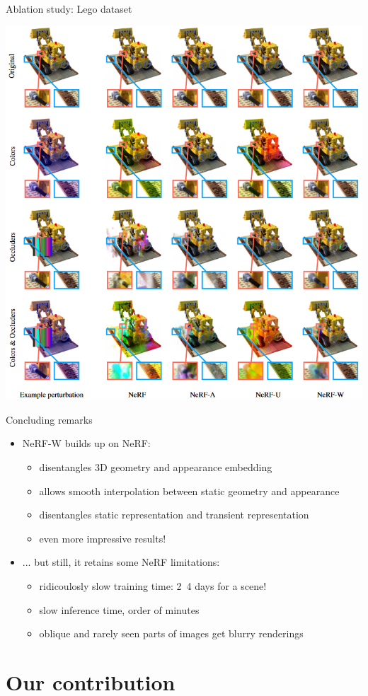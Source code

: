 \documentclass[aspectratio=1610]{beamer}
\begin{document}
\begin{frame}{Ablation study: Lego dataset}
    \begin{center}
        \includegraphics[width=.51\textwidth]{results-lego.png}
    \end{center}
\end{frame}

\begin{frame}{Concluding remarks}
    \begin{itemize}
        \item NeRF-W builds up on NeRF:
        \begin{itemize}
            \item disentangles 3D geometry and appearance embedding
            \item allows smooth interpolation between static geometry and appearance
            \item disentangles static representation and transient representation
            \item even more impressive results!
        \end{itemize}
        \bigskip
        \pause
        \item ... but still, it retains some NeRF limitations:
        \begin{itemize}
            \item ridicoulosly slow training time: 2~4 days for a scene!
            \item slow inference time, order of minutes
            \item oblique and rarely seen parts of images get blurry renderings
        \end{itemize}
    \end{itemize}
\end{frame}

\section{Our contribution}
\end{document}
